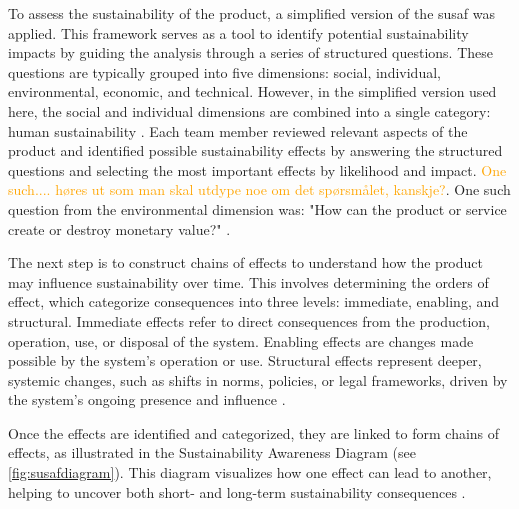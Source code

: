 To assess the sustainability of the product, a simplified version of the \acrfull{susaf} was applied. This framework serves as a tool to identify potential sustainability impacts by guiding the analysis through a series of structured questions. These questions are typically grouped into five dimensions: social, individual, environmental, economic, and technical. However, in the simplified version used here, the social and individual dimensions are combined into a single category: human sustainability \cite{ntnususaf}. Each team member reviewed relevant aspects of the product and identified possible sustainability effects by answering the structured questions and selecting the most important effects by likelihood and impact. \textcolor{orange}{One such.... høres ut som man skal utdype noe om det spørsmålet, kanskje?}. One such question from the environmental dimension was: "How can the product or service create or destroy monetary value?" \cite{susosusaf}.

The next step is to construct chains of effects to understand how the product may influence sustainability over time. This involves determining the orders of effect, which categorize consequences into three levels: immediate, enabling, and structural. Immediate effects refer to direct consequences from the production, operation, use, or disposal of the system. Enabling effects are changes made possible by the system's operation or use. Structural effects represent deeper, systemic changes, such as shifts in norms, policies, or legal frameworks, driven by the system's ongoing presence and influence \cite{susosusaf}.

Once the effects are identified and categorized, they are linked to form chains of effects, as illustrated in the Sustainability Awareness Diagram (see \autoref{fig:susafdiagram}). This diagram visualizes how one effect can lead to another, helping to uncover both short- and long-term sustainability consequences \cite{susosusaf}.

